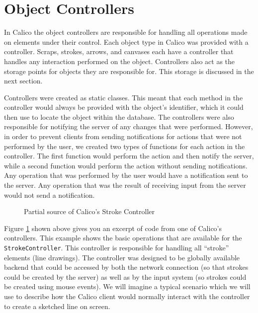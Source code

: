 \section{Object Controllers}
In Calico the object controllers are responsible for handling all operations made on elements under their control. Each object type in Calico was provided with a controller.
Scraps, strokes, arrows, and canvases each have a controller that handles any interaction performed on the object. 
Controllers also act as the storage points for objects they are responsible for. This storage is discussed in the next section.

Controllers were created as static classes. This meant that each method in the controller would always be provided with the object's identifier, which it could then use to locate the object within the database. 
The controllers were also responsible for notifying the server of any changes that were performed. However, in order to prevent clients from sending notifications for actions that were not performed by the user, we created two types of functions for each action in the controller. The first function would perform the action and then notify the server, while a second function would perform the action without sending notifications. Any operation that was performed by the user would have a notification sent to the server. Any operation that was the result of receiving input from the server would not send a notification.

\begin{figure}[htb]
  \centering
  \small
  
  \normalsize
  \caption{Partial source of Calico's Stroke Controller}
  \label{code:controller}
\end{figure}

Figure \ref{code:controller} shown above gives you an excerpt of code from one of Calico's controllers. This example shows the basic operations that are available for the \texttt{StrokeController}. This controller is responsible for handling all ``stroke'' elements (line drawings). The controller was designed to be globally available backend that could be accessed by both the network connection (so that strokes could be created by the server) as well as by the input system (so strokes could be created using mouse events). We will imagine a typical scenario which we will use to describe how the Calico client would normally interact with the controller to create a sketched line on screen.

